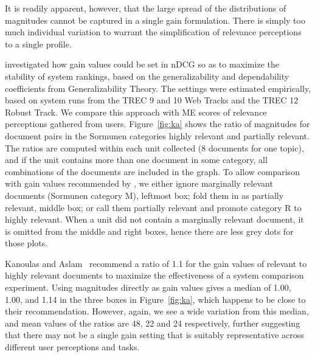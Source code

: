 It is readily apparent, however, that the large spread of the 
distributions of
magnitudes cannot be captured in a single gain formulation.
There is simply too much individual variation to warrant the
simplification of relevance perceptions to a single profile.

\citet{KanAsl03} investigated how gain values could be set in nDCG so
as to maximize the stability of system rankings, based on the
generalizability and dependability coefficients from Generalizability
Theory.
The settings were estimated empirically, based on system runs from the
TREC 9 and 10 Web Tracks and the TREC 12 Robust Track.
We compare this approach with ME scores of relevance perceptions
gathered from users.
Figure~\ref{fig:ka} shows the ratio of magnitudes for document pairs in
the Sormunen categories highly relevant and partially relevant.
The ratios are computed within each unit collected (8 documents for one
topic), and if the unit contains more than one document in some
category, all combinations of the documents are included in the graph.
To allow comparison with gain values recommended by 
\citet{KanAsl03}, we either ignore marginally 
relevant documents (Sormunen category M), leftmost box; fold them in as
partially relevant, middle box; or call them partially relevant and
promote category R to highly relevant.
When a unit did not contain a marginally relevant document, it is
omitted from the middle and right boxes, hence there are less grey dots
for those plots.

Kanoulas and Aslam~\cite{KanAsl03} recommend a ratio of 1.1 for the
gain values of relevant to highly relevant documents to maximize the
effectiveness of a system comparison experiment.
Using magnitudes directly as gain values gives a median of 1.00, 1.00,
and 1.14 in the three boxes in Figure~\ref{fig:ka}, which happens to be
close to their recommendation.
However, again, we see a wide variation from this median, and mean
values of the ratios are 48, 22 and 24 respectively, further suggesting
that there may not be a single gain setting that is suitably
representative across different user perceptions and tasks.

